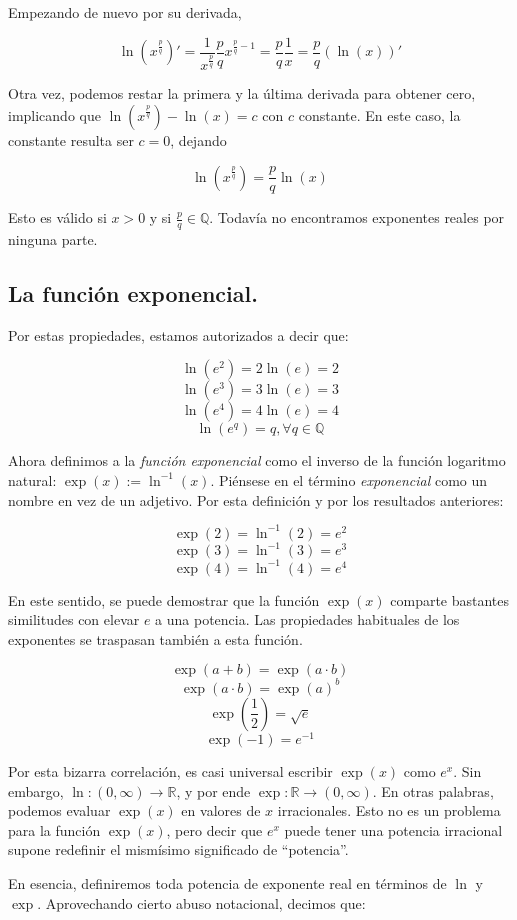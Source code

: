 Empezando de nuevo por su derivada,

$$\ln(x^{\frac{p}{q}})' = \frac{1}{x^{\frac{p}{q}}} \frac{p}{q} x^{\frac{p}{q} - 1} = \frac{p}{q} \frac{1}{x} = \frac{p}{q} (\ln(x))'$$

Otra vez, podemos restar la primera y la última derivada para obtener cero, implicando que $\ln(x^{\frac{p}{q}}) - \ln(x) = c$ con $c$ constante. En este caso, la constante resulta ser $c = 0$, dejando

$$\ln(x^{\frac{p}{q}}) = \frac{p}{q} \ln(x)$$

Esto es válido si $x > 0$ y si $\frac{p}{q} \in \mathbb{Q}$. Todavía no encontramos exponentes reales por ninguna parte.

\subsection{La función exponencial.}

Por estas propiedades, estamos autorizados a decir que:

$$\ln(e^2) = 2\ln(e) = 2$$
$$\ln(e^3) = 3\ln(e) = 3$$
$$\ln(e^4) = 4\ln(e) = 4$$
$$\ln(e^{q}) = q, \forall q \in \mathbb{Q}$$

Ahora definimos a la \textit{función exponencial} como el inverso de la función logaritmo natural: $\exp(x) := \ln^{-1}(x)$. Piénsese en el término \textit{exponencial} como un nombre en vez de un adjetivo. Por esta definición y por los resultados anteriores:

$$\exp(2) = \ln^{-1}(2) = e^2$$
$$\exp(3) = \ln^{-1}(3) = e^3$$
$$\exp(4) = \ln^{-1}(4) = e^4$$

En este sentido, se puede demostrar que la función $\exp(x)$ comparte bastantes similitudes con elevar $e$ a una potencia. Las propiedades habituales de los exponentes se traspasan también a esta función.

$$\exp(a + b) = \exp(a\cdot b)$$
$$\exp(a \cdot b) = \exp(a)^b$$
$$\exp\left(\frac{1}{2}\right) = \sqrt{e}$$
$$\exp(-1) = e^{-1}$$

Por esta bizarra correlación, es casi universal escribir $\exp(x)$ como $e^x$. Sin embargo, $\ln: (0, \infty) \to \mathbb{R}$, y por ende $\exp: \mathbb{R} \to (0, \infty)$. En otras palabras, podemos evaluar $\exp(x)$ en valores de $x$ irracionales. Esto no es un problema para la función $\exp(x)$, pero decir que $e^x$ puede tener una potencia irracional supone redefinir el mismísimo significado de \enquote{potencia}.

En esencia, definiremos toda potencia de exponente real en términos de $\ln$ y $\exp$. Aprovechando cierto abuso notacional, decimos que:

